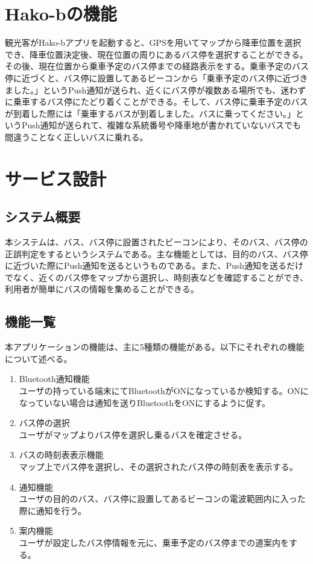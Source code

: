 \documentclass[openany,11pt,papersize]{jsbook}
\begin{document}
\section{Hako-bの機能}
観光客がHako-bアプリを起動すると、GPSを用いてマップから降車位置を選択でき、降車位置決定後、現在位置の周りにあるバス停を選択することができる。その後、現在位置から乗車予定のバス停までの経路表示をする。乗車予定のバス停に近づくと、バス停に設置してあるビーコンから「乗車予定のバス停に近づきました。」というPush通知が送られ、近くにバス停が複数ある場所でも、迷わずに乗車するバス停にたどり着くことができる。そして、バス停に乗車予定のバスが到着した際には「乗車するバスが到着しました。バスに乗ってください。」というPush通知が送られて、複雑な系統番号や降車地が書かれていないバスでも間違うことなく正しいバスに乗れる。

\section{サービス設計}

\subsection{システム概要}
本システムは、バス、バス停に設置されたビーコンにより、そのバス、バス停の正誤判定をするというシステムである。主な機能としては、目的のバス、バス停に近づいた際にPush通知を送るというものである。また、Push通知を送るだけでなく、近くのバス停をマップから選択し、時刻表などを確認することができ、利用者が簡単にバスの情報を集めることができる。



\subsection{機能一覧}
本アプリケーションの機能は、主に5種類の機能がある。以下にそれぞれの機能について述べる。
\begin{enumerate}

\item Bluetooth通知機能\\
ユーザの持っている端末にてBluetoothがONになっているか検知する。ONになっていない場合は通知を送りBluetoothをONにするように促す。
\item バス停の選択\\
ユーザがマップよりバス停を選択し乗るバスを確定させる。
\item バスの時刻表表示機能\mbox{}\\
マップ上でバス停を選択し、その選択されたバス停の時刻表を表示する。
\item 通知機能\mbox{}\\
ユーザの目的のバス、バス停に設置してあるビーコンの電波範囲内に入った際に通知を行う。
\item 案内機能\mbox{}\\
ユーザが設定したバス停情報を元に、乗車予定のバス停までの道案内をする。

\end{enumerate}
\end{document}
